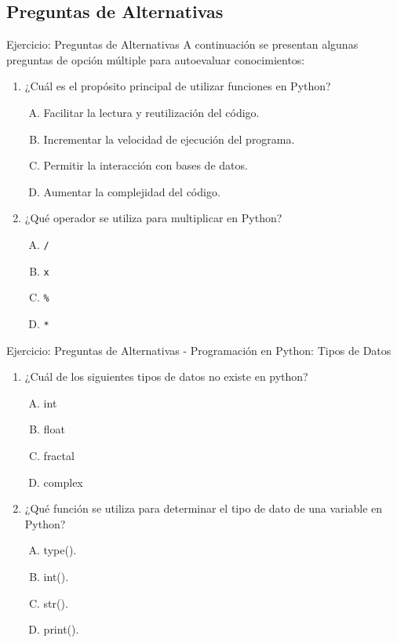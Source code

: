 \documentclass[10pt]{beamer}
\begin{document}
\subsection{Preguntas de Alternativas}
\begin{frame}{Ejercicio: Preguntas de Alternativas}
  A continuación se presentan algunas preguntas de opción múltiple para autoevaluar conocimientos:
  \begin{enumerate}
    \item ¿Cuál es el propósito principal de utilizar funciones en Python?
      \begin{enumerate}[A)]
        \item Facilitar la lectura y reutilización del código.
        \item Incrementar la velocidad de ejecución del programa.
        \item Permitir la interacción con bases de datos.
        \item Aumentar la complejidad del código.
      \end{enumerate}
    \item ¿Qué operador se utiliza para multiplicar en Python?
      \begin{enumerate}[A)]
        \item \texttt{/}
        \item \texttt{x}
        \item \texttt{\%}
        \item \texttt{*}
      \end{enumerate}
  \end{enumerate}
  \vspace{0.3cm}
\end{frame}


\begin{frame}{Ejercicio: Preguntas de Alternativas - Programación en Python: Tipos de Datos} 
    \begin{enumerate} 
        \item ¿Cuál de los siguientes tipos de datos no existe en python? 
        \begin{enumerate}[A)] 
            \item int
            \item float
            \item fractal 
            \item complex 
        \end{enumerate} 
        \item ¿Qué función se utiliza para determinar el tipo de dato de una variable en Python? 
        \begin{enumerate}[A)] 
            \item type(). 
            \item int(). 
            \item str(). 
            \item print(). 
        \end{enumerate} 
    \end{enumerate}
\end{frame}
\end{document}
